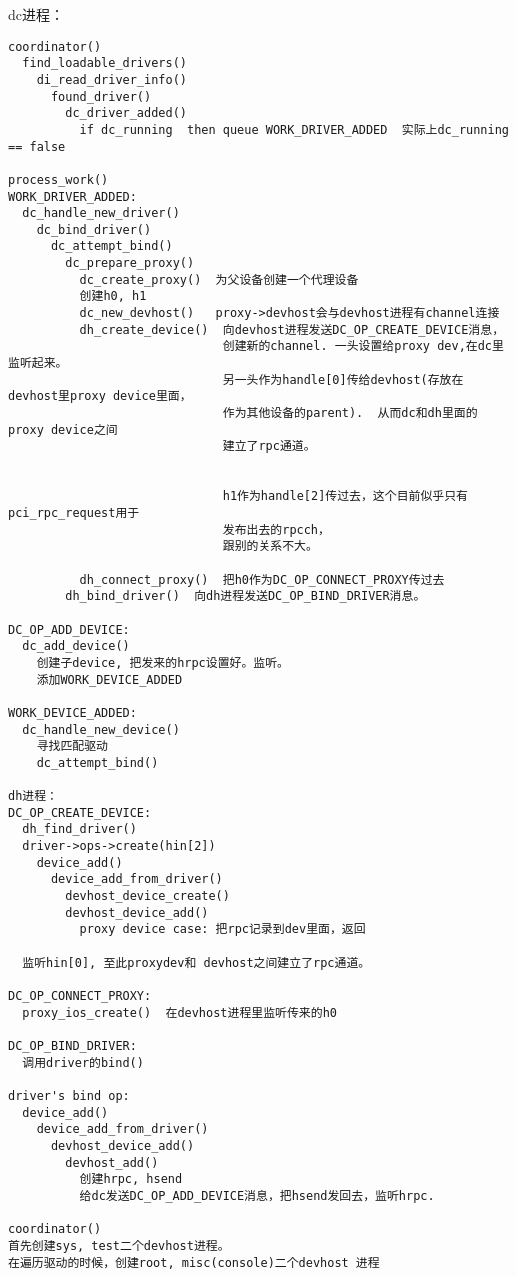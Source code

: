 dc进程：
\begin{verbatim}
coordinator()
  find_loadable_drivers()
    di_read_driver_info()
      found_driver()
        dc_driver_added()
          if dc_running  then queue WORK_DRIVER_ADDED  实际上dc_running == false

process_work()
WORK_DRIVER_ADDED:
  dc_handle_new_driver()
    dc_bind_driver()
      dc_attempt_bind()
        dc_prepare_proxy()
          dc_create_proxy()  为父设备创建一个代理设备
          创建h0, h1
          dc_new_devhost()   proxy->devhost会与devhost进程有channel连接
          dh_create_device()  向devhost进程发送DC_OP_CREATE_DEVICE消息，
                              创建新的channel. 一头设置给proxy dev,在dc里监听起来。
                              另一头作为handle[0]传给devhost(存放在devhost里proxy device里面，
                              作为其他设备的parent).  从而dc和dh里面的proxy device之间
                              建立了rpc通道。


                              h1作为handle[2]传过去，这个目前似乎只有pci_rpc_request用于
                              发布出去的rpcch，
                              跟别的关系不大。

          dh_connect_proxy()  把h0作为DC_OP_CONNECT_PROXY传过去
        dh_bind_driver()  向dh进程发送DC_OP_BIND_DRIVER消息。

DC_OP_ADD_DEVICE:
  dc_add_device()
    创建子device, 把发来的hrpc设置好。监听。
    添加WORK_DEVICE_ADDED

WORK_DEVICE_ADDED:
  dc_handle_new_device()
    寻找匹配驱动
    dc_attempt_bind()
                
dh进程：
DC_OP_CREATE_DEVICE:
  dh_find_driver()
  driver->ops->create(hin[2])
    device_add()
      device_add_from_driver()
        devhost_device_create()
        devhost_device_add()
          proxy device case: 把rpc记录到dev里面，返回
          
  监听hin[0], 至此proxydev和 devhost之间建立了rpc通道。

DC_OP_CONNECT_PROXY:
  proxy_ios_create()  在devhost进程里监听传来的h0

DC_OP_BIND_DRIVER:
  调用driver的bind()

driver's bind op:
  device_add()
    device_add_from_driver()
      devhost_device_add()
        devhost_add()
          创建hrpc, hsend
          给dc发送DC_OP_ADD_DEVICE消息，把hsend发回去，监听hrpc.

coordinator()
首先创建sys, test二个devhost进程。
在遍历驱动的时候，创建root, misc(console)二个devhost 进程


\end{verbatim}
